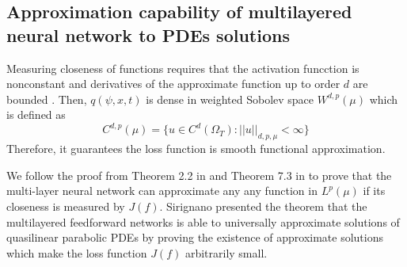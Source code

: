 \documentclass{article}
\begin{document}
\subsection{Approximation capability of multilayered neural network to PDEs solutions}



Measuring closeness of functions requires that the activation funcction is nonconstant and derivatives of the approximate function up to order $d$ are bounded \cite{hornik}. 
Then, $q(\psi,x,t)$ is dense in weighted Sobolev space $W^{d,p}(\mu)$ which is defined as \cite{hornik}
\begin{equation}
C^{d,p}(\mu) = \{ u \in C^{d}(\Omega_{T}): ||u||_{d,p,\mu} < \infty \}
\end{equation}
Therefore, it guarantees the loss function is smooth functional approximation.

We follow the proof from Theorem 2.2 in \cite{kurkova} and Theorem 7.3 in \cite{sirignano} to prove that the multi-layer neural network can approximate any any function in $L^{p}(\mu)$ if its closeness is measured by $J(f)$. 
Sirignano \cite{sirignano} presented the theorem that the multilayered feedforward networks is able to universally approximate solutions of quasilinear parabolic PDEs by proving the existence of approximate solutions which make the loss function $J(f)$ arbitrarily small.
\end{document}
